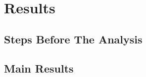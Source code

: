 \chapter{Results}
\graphicspath{{Chapter5/Figs/}{Chapter5/Figs/}}



\section{Steps Before The Analysis}
\label{steps-before-analysis}


\section{Main Results}
\label{main-results}


